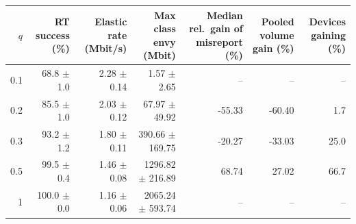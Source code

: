 \begin{tabular}{rrrrrrr}
\toprule
$q$ & RT success (\%) & Elastic rate (Mbit/s) & Max class envy (Mbit) & Median rel.\ gain of misreport (\%) & Pooled volume gain (\%) & Devices gaining (\%) \\
\midrule
0.1 & 68.8 $\pm$ 1.0 & 2.28 $\pm$ 0.14 & 1.57 $\pm$ 2.65 & -- & -- & -- \\
0.2 & 85.5 $\pm$ 1.0 & 2.03 $\pm$ 0.12 & 67.97 $\pm$ 49.92 & -55.33 & -60.40 & 1.7 \\
0.3 & 93.2 $\pm$ 1.2 & 1.80 $\pm$ 0.11 & 390.66 $\pm$ 169.75 & -20.27 & -33.03 & 25.0 \\
0.5 & 99.5 $\pm$ 0.4 & 1.46 $\pm$ 0.08 & 1296.82 $\pm$ 216.89 & 68.74 & 27.02 & 66.7 \\
1 & 100.0 $\pm$ 0.0 & 1.16 $\pm$ 0.06 & 2065.24 $\pm$ 593.74 & -- & -- & -- \\
\bottomrule
\end{tabular}
